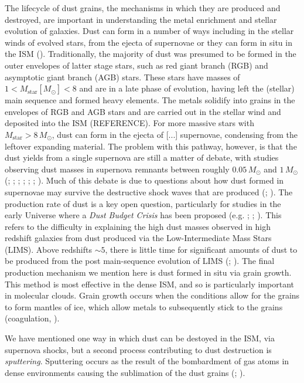 The lifecycle of dust grains, the mechanisms in which they are produced and destroyed, are important in understanding the metal enrichment and stellar evolution of galaxies. Dust can form in a number of ways including in the stellar winds of evolved stars, from the ejecta of supernovae or they can form in situ in the ISM (\citealt{Draine_2009}). Traditionally, the majority of dust was presumed to be formed in the outer envelopes of latter stage stars, such as red giant branch (RGB) and asymptotic giant branch (AGB) stars. These stars have masses of $1 < M_\textrm{star} [M_\odot] < 8$ and are in a late phase of evolution, having left the (stellar) main sequence and formed heavy elements. The metals solidify into grains in the envelopes of RGB and AGB stars and are carried out in the stellar wind and deposited into the ISM ({\color{red}REFERENCE}). For more massive stars with $M_\textrm{star} > 8\,M_\odot$, dust can form in the ejecta of {\color{red}[...]} supernovae, condensing from the leftover expanding material. The problem with this pathway, however, is that the dust yields from a single supernova are still a matter of debate, with studies observing dust masses in supernova remnants between roughly $0.05\,M_\odot$ and $1\,M_\odot$ (\citealt{Rho_2008}; \citealt{Dunne_2009}; \citealt{Barlow_2010}; \citealt{Matsuura_2011}; \citealt{Gomez_2012}; \citealt{Matsuura_2015}; \citealt{Chawner_2019}). Much of this debate is due to questions about how dust formed in supernovae may survive the destructive shock waves that are produced (\citealt{Draine_1979}; \citealt{Jones_1996}). The production rate of dust is a key open question, particularly for studies in the early Universe where a \textit{Dust Budget Crisis} has been proposed (e.g. \citealt{Dwek_2007}; \citealt{Michalowski_2010}; \citealt{Valiante_2011}). This refers to the difficulty in explaining the high dust masses observed in high redshift galaxies from dust produced via the Low-Intermediate Mass Stars (LIMS). Above redshifts $\sim 5$, there is little time for significant amounts of dust to be produced from the post main-sequence evolution of LIMS (\citealt{Morgan_2003}; \citealt{DiCriscienzo_2013}). The final production mechanism we mention here is dust formed in situ via grain growth. This method is most effective in the dense ISM, and so is particularly important in molecular clouds. Grain growth occurs when the conditions allow for the grains to form mantles of ice, which allow metals to subsequently stick to the grains (coagulation, \citealt{Blain_2004}).

We have mentioned one way in which dust can be destoyed in the ISM, via supernova shocks, but a second process contributing to dust destruction is \textit{sputtering}. Sputtering occurs as the result of the bombardment of gas atoms in dense environments causing the sublimation of the dust grains (\citealt{Barlow_1978}; \citealt{Jones_2004}).

